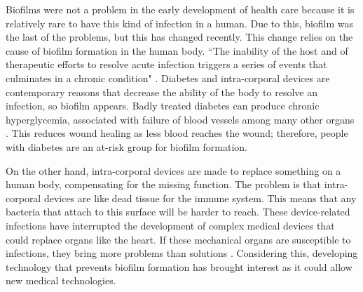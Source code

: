 
Biofilms were not a problem in the early development of health care because it is relatively rare to have this kind of infection in a human. Due to this, biofilm was the last of the problems, but this has changed recently. This change relies on the cause of biofilm formation in the human body. ``The inability of the host and of therapeutic efforts to resolve acute infection triggers a series of events that culminates in a chronic condition" \cite{CiernyIII2006TreatmentInfection}. Diabetes and intra-corporal devices are contemporary reasons that decrease the ability of the body to resolve an infection, so biofilm appears. Badly treated diabetes can produce chronic hyperglycemia, associated with failure of blood vessels among many other organs \cite{AmericanDiabetesAssociationandothers2014DiagnosisMellitus}. This reduces wound healing as less blood reaches the wound; therefore, people with diabetes are an at-risk group for biofilm formation.

On the other hand, intra-corporal devices are made to replace something on a human body, compensating for the missing function. The problem is that intra-corporal devices are like dead tissue for the immune system. This means that any bacteria that attach to this surface will be harder to reach. These device-related infections have interrupted the development of complex medical devices that could replace organs like the heart. If these mechanical organs are susceptible to infections, they bring more problems than solutions \cite{Costerton1999IntroductionBiofilm}. Considering this, developing technology that prevents biofilm formation has brought interest as it could allow new medical technologies.

